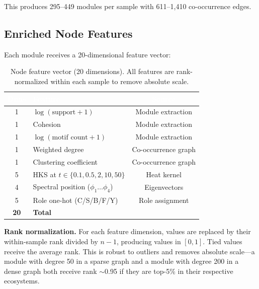 \documentclass{../yalumba}
\begin{document}
This produces 295--449 modules per sample with 611--1{,}410 co-occurrence
edges.

\subsection{Enriched Node Features}

Each module receives a 20-dimensional feature vector:

\begin{table}[H]
  \centering
  \tablestyle
  \caption{Node feature vector (20 dimensions).  All features are
    rank-normalized within each sample to remove absolute scale.}
  \label{tab:features}
  \begin{tabular}{clc}
    \toprule
    \rowcolor{table-header}
    \textcolor{white}{\textbf{Dims}} &
    \textcolor{white}{\textbf{Feature}} &
    \textcolor{white}{\textbf{Source}} \\
    \midrule
    1 & $\log(\text{support} + 1)$ & Module extraction \\
    1 & Cohesion & Module extraction \\
    1 & $\log(\text{motif count} + 1)$ & Module extraction \\
    1 & Weighted degree & Co-occurrence graph \\
    1 & Clustering coefficient & Co-occurrence graph \\
    5 & HKS at $t \in \{0.1, 0.5, 2, 10, 50\}$ & Heat kernel \\
    4 & Spectral position ($\phi_1 \ldots \phi_4$) & Eigenvectors \\
    5 & Role one-hot (C/S/B/F/Y) & Role assignment \\
    \midrule
    \textbf{20} & \textbf{Total} & \\
    \bottomrule
  \end{tabular}
\end{table}


\begin{definition}
\textbf{Rank normalization.}  For each feature dimension, values are replaced
by their within-sample rank divided by $n-1$, producing values in $[0, 1]$.
Tied values receive the average rank.  This is robust to outliers and removes
absolute scale---a module with degree 50 in a sparse graph and a module with
degree 200 in a dense graph both receive rank $\sim$0.95 if they are
top-5\% in their respective ecosystems.
\end{definition}
\end{document}
